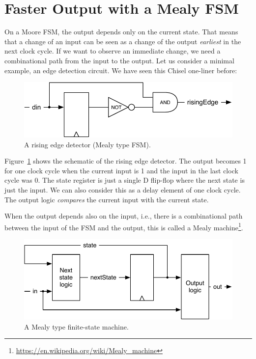 \documentclass[%
    10pt,
    headinclude, footexclude,
    openright, %
    notitlepage,
    cleardoubleempty,
    headsepline,
    pointlessnumbers,
    bibtotoc, idxtotoc,
    ]{scrbook}
\newcommand{\scale}{0.7}
\newcommand{\myref}[2]{\href{#1}{#2}}
\renewcommand{\myref}[2]{{#2}{\footnote{\url{#1}}}}
\begin{document}
\section{Faster Output with a Mealy FSM}

On a Moore FSM, the output depends only on the current state.
That means that a change of an input can be seen as a change of the
output \emph{earliest} in the next clock cycle.
If we want to observe an immediate change, we need a combinational
path from the input to the output.
Let us consider a minimal example, an edge detection circuit.
We have seen this Chisel one-liner before:


\begin{figure}
  \centering
  \includegraphics[scale=\scale]{figures/fsm-rising}
  \caption{A rising edge detector (Mealy type FSM).}
  \label{fig:fsm-rising}
\end{figure}

Figure~\ref{fig:fsm-rising} shows the schematic of the rising edge detector.
The output becomes 1 for one clock cycle when the current input is 1
and the input in the last clock cycle was 0.
The state register is just a single D flip-flop where the next state
is just the input. We can also consider this as a delay element of one
clock cycle. The output logic \emph{compares} the current
input with the current state.



When the output depends also on the input, i.e., there is a combinational path between
the input of the FSM and the output, this is called a
\myref{https://en.wikipedia.org/wiki/Mealy_machine}{Mealy machine}.

\begin{figure}
  \centering
  \includegraphics[scale=\scale]{figures/mealy}
  \caption{A Mealy type finite-state machine.}
  \label{fig:mealy}
\end{figure}
\end{document}
